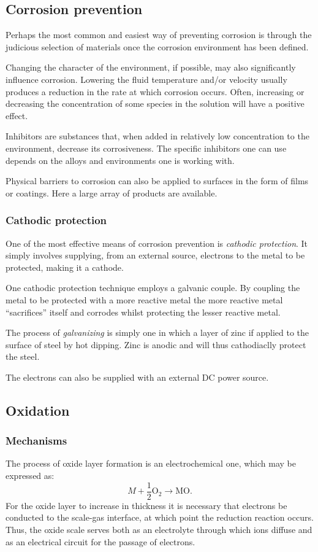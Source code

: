 \subsection{Corrosion prevention} 
Perhaps the most common and easiest way of preventing corrosion is through the judicious selection of materials once the corrosion environment has been defined.

Changing the character of the environment, if possible, may also significantly influence corrosion. Lowering the fluid temperature and/or velocity usually produces a reduction in the rate at which corrosion occurs. Often, increasing or decreasing the concentration of some species in the solution will have a positive effect.

Inhibitors are substances that, when added in relatively low concentration to the environment, decrease its corrosiveness. The specific inhibitors one can use depends on the alloys and environments one is working with. 

Physical barriers to corrosion can also be applied to surfaces in the form of films or coatings. Here a large array of products are available.

\subsubsection{Cathodic protection} \label{afs:cathodic}
One of the most effective means of corrosion prevention is \textit{cathodic protection}. It simply involves supplying, from an external source, electrons to the metal to be protected, making it a cathode.

One cathodic protection technique employs a galvanic couple. By coupling the metal to be protected with a more reactive metal the more reactive metal ``sacrifices'' itself and corrodes whilst protecting the lesser reactive metal.

The process of \textit{galvanizing} is simply one in which a layer of zinc if applied to the surface of steel by hot dipping. Zinc is anodic and will thus cathodiaclly protect the steel. 

The electrons can also be supplied with an external DC power source. 

\subsection{Oxidation}

\subsubsection{Mechanisms}
The process of oxide layer formation is an electrochemical one, which may be expressed as:
\[ 
M + \frac{1}{2} \mathrm{O}_2 \rightarrow \mathrm{MO}
.\]
For the oxide layer to increase in thickness it is necessary that electrons be conducted to the scale-gas interface, at which point the reduction reaction occurs. Thus, the oxide scale serves both as an electrolyte through which ions diffuse and as an electrical circuit for the passage of electrons.


